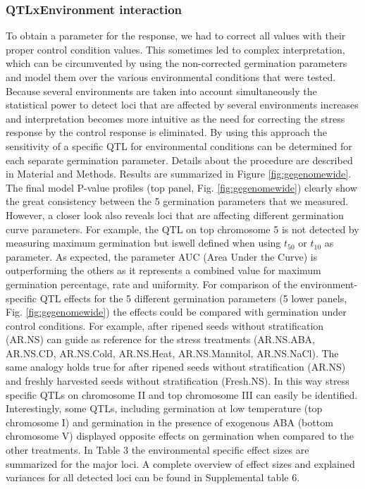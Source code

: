 \subsubsection{QTLxEnvironment interaction}
To obtain a parameter for the response, we had to correct all values with their proper control condition 
values. This sometimes led to complex interpretation, which can be circumvented by using the non-corrected 
germination parameters and model them over the various environmental conditions that were tested. Because 
several environments are taken into account simultaneously the statistical power to detect loci that are 
affected by several environments increases and interpretation becomes more intuitive as the need for 
correcting the stress response by the control response is eliminated. By using this approach the 
sensitivity of a specific QTL for environmental conditions can be determined for each separate germination 
parameter. Details about the procedure are described in Material and Methods. Results are summarized in 
Figure \ref{fig:gegenomewide}. The final model P-value profiles (top panel, Fig. \ref{fig:gegenomewide}) clearly show the great consistency 
between the 5 germination parameters that we measured. However, a closer look also reveals loci that 
are affecting different germination curve parameters. For example, the QTL on top chromosome 5 is not 
detected by measuring maximum germination but iswell defined when using $t_{50}$ or $t_{10}$ as parameter. As 
expected, the parameter AUC (Area Under the Curve) is outperforming the others as it represents a 
combined value for maximum germination percentage, rate and uniformity. For comparison of the 
environment-specific QTL effects for the 5 different germination parameters (5 lower panels, Fig. \ref{fig:gegenomewide}) 
the effects could be compared with germination under control conditions. For example, after ripened 
seeds without stratification (AR.NS) can guide as reference for the stress treatments (AR.NS.ABA, AR.NS.CD, 
AR.NS.Cold, AR.NS.Heat, AR.NS.Mannitol, AR.NS.NaCl). The same analogy holds true for after ripened seeds
without stratification (AR.NS) and freshly harvested seeds without stratification (Fresh.NS). In this way 
stress specific QTLs on chromosome II and top chromosome III can easily be identified. Interestingly, some 
QTLs, including germination at low temperature (top chromosome I) and germination in the presence of 
exogenous ABA (bottom chromosome V) displayed opposite effects on germination when compared to the 
other treatments. In Table 3 the environmental specific effect sizes are summarized for the major loci. 
A complete overview of effect sizes and explained variances for all detected loci can be found in 
Supplemental table 6.


